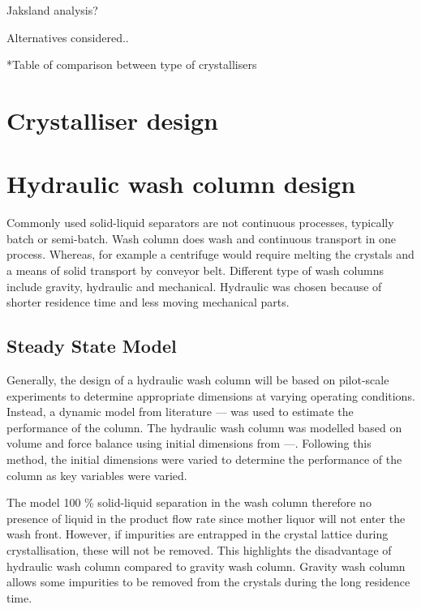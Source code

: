 Jaksland analysis?

Alternatives considered..

*Table of comparison between type of crystallisers

 




\section{Crystalliser design}











\section{Hydraulic wash column design}

Commonly used solid-liquid separators are not continuous processes, typically batch or semi-batch. Wash column does wash and continuous transport in one process. Whereas, for example a centrifuge would require  melting the crystals and a means of solid transport by conveyor belt. Different type of wash columns include gravity, hydraulic and mechanical. Hydraulic was chosen because of shorter residence time and less moving mechanical parts. 

\subsection{Steady State Model}
Generally, the design of a hydraulic wash column will be based on pilot-scale experiments to determine appropriate dimensions at varying operating conditions. Instead, a dynamic model from literature --- was used to estimate the performance of the column. The hydraulic wash column was modelled based on volume and force balance using initial dimensions from ---. Following this method, the initial dimensions were varied to determine the performance of the column as key variables were varied.  

The model 100 \% solid-liquid separation in the wash column therefore no presence of liquid in the product flow rate since mother liquor will not enter the wash front. However, if impurities are entrapped in the crystal lattice during crystallisation, these will not be removed. This highlights the disadvantage of hydraulic wash column compared to gravity wash column. Gravity wash column allows some impurities to be removed from the crystals during the long residence time. 

